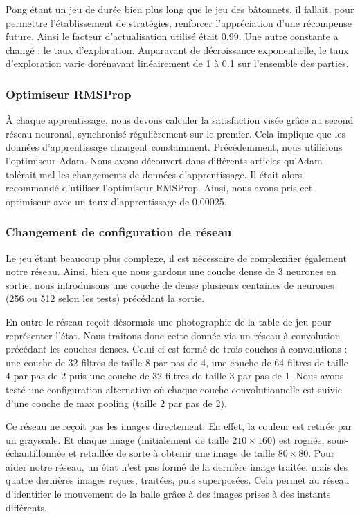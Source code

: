 Pong étant un jeu de durée bien plus long que le jeu des bâtonnets, il fallait, pour permettre l'établissement de stratégies, renforcer l'appréciation d'une
récompense future. Ainsi le facteur d'actualisation utilisé était 0.99. Une autre constante a changé : le taux d'exploration. Auparavant de décroissance exponentielle,
le taux d'exploration varie dorénavant linéairement de 1 à 0.1 sur l'ensemble des parties.

\subsubsection{Optimiseur RMSProp}

À chaque apprentissage, nous devons calculer la satisfaction visée grâce au second réseau neuronal, synchronisé régulièrement sur le premier. Cela implique
que les données d'apprentissage changent constamment. Précédemment, nous utilisions l'optimiseur Adam. Nous avons découvert dans différents articles qu'Adam tolérait
mal les changements de données d'apprentissage. Il était alors recommandé d'utiliser l'optimiseur RMSProp. Ainsi, nous avons pris cet optimiseur avec un 
taux d'apprentissage de 0.00025.

\subsubsection{Changement de configuration de réseau}

Le jeu étant beaucoup plus complexe, il est nécessaire de complexifier également notre réseau. Ainsi, bien que nous gardons une couche dense de 3 neurones en sortie,
nous introduisons une couche de dense plusieurs centaines de neurones (256 ou 512 selon les tests) précédant la sortie. 

En outre le réseau reçoit désormais une photographie de la table de jeu pour représenter l'état. Nous traitons donc cette donnée via un réseau à convolution précédant
les couches denses. Celui-ci est formé de trois couches à convolutions : une couche de 32 filtres de taille 8 par pas de 4, une couche de 64 filtres de taille 4 par pas
de 2 puis une couche de 32 filtres de taille 3 par pas de 1. Nous avons testé une configuration alternative où chaque couche convolutionnelle est suivie d'une
couche de max pooling (taille 2 par pas de 2).

Ce réseau ne reçoit pas les images directement. En effet, la couleur est retirée par un grayscale. Et chaque image (initialement de taille $210 \times 160$) est rognée,
sous-échantillonnée et retaillée de sorte à obtenir une image de taille $80 \times 80$. Pour aider notre réseau, un état n'est pas formé de la dernière image traitée, mais
des quatre dernières images reçues, traitées, puis superposées. Cela permet au réseau d'identifier le mouvement de la balle grâce à des images prises à des instants
différents.

